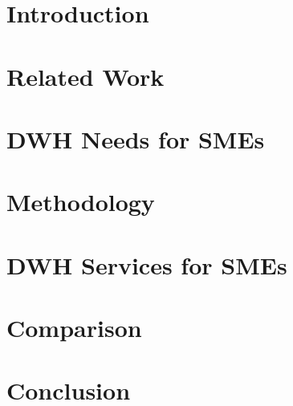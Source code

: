 \documentclass[12pt]{article}
\begin{document}
\maketitle



\newpage

\section{Introduction}
\label{sec:introduction}


\section{Related Work}
\label{sec:related-work}


\section{DWH Needs for SMEs}
\label{sec:dwh-needs-for-smes}


\section{Methodology}
\label{sec:methodology}


\section{DWH Services for SMEs}
\label{sec:dwh-services-for-smes}


\section{Comparison}
\label{sec:comparison}


\section{Conclusion}
\label{sec:conclusion}


\newpage
\printbibliography
\end{document}
